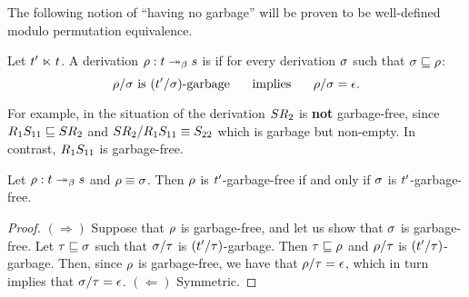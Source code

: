 The following notion of ``having no garbage'' will be proven to be well-defined
modulo permutation equivalence.

\begin{definition}
Let $t' \mathrel{\ltimes} t$.
A derivation $\rho : t \mathrel{\twoheadrightarrow_\beta} s$ is 
if
for every derivation $\sigma$ such that $\sigma \sqsubseteq \rho$:
\[
  \rho/\sigma \text{ is $(t'/\sigma)$-garbage}
  \hspace{.5cm}\text{ implies }\hspace{.5cm}
  \rho/\sigma = \epsilon.
\]
\end{definition}

For example, in the situation of 
the derivation $SR_2$ is {\bf not} garbage-free,
since $R_1S_{11} \sqsubseteq SR_2$
and $SR_2/R_1S_{11} \equiv S_{22}$
which is garbage but non-empty.
In contrast, $R_1S_{11}$ is garbage-free.


\begin{lemma}
Let $\rho : t \mathrel{\twoheadrightarrow_\beta} s$ and $\rho \equiv \sigma$.
Then $\rho$ is $t'$-garbage-free
if and only if $\sigma$ is $t'$-garbage-free.
\end{lemma}
\begin{proof}
$(\Rightarrow)$
Suppose that $\rho$ is garbage-free, and let us show that $\sigma$ is garbage-free.
Let $\tau \sqsubseteq \sigma$ such that $\sigma/\tau$ is $(t'/\tau)$-garbage.
Then $\tau \sqsubseteq \rho$ and $\rho/\tau$ is $(t'/\tau)$-garbage. 
Then, since $\rho$ is garbage-free,
we have that $\rho/\tau = \epsilon$,
which in turn implies that $\sigma/\tau = \epsilon$.
$(\Leftarrow)$ Symmetric.
\end{proof}

